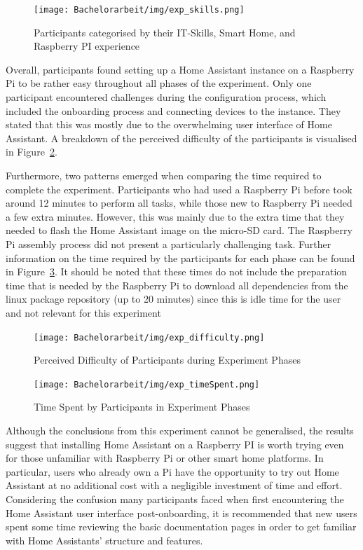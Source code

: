 \begin{figure}[H]
    \centering
    \texttt{[image: Bachelorarbeit/img/exp\_skills.png]}
    \caption{Participants categorised by their IT-Skills, Smart Home, and Raspberry PI experience}
    \label{fig:exp_skills}
\end{figure}

Overall, participants found setting up a Home Assistant instance on a Raspberry Pi to be rather easy throughout all phases of the experiment. Only one participant encountered challenges during the configuration process, which included the onboarding process and connecting devices to the instance. They stated that this was mostly due to the overwhelming user interface of Home Assistant. A breakdown of the perceived difficulty of the participants is visualised in Figure~\ref{fig:exp_difficulty}.

Furthermore, two patterns emerged when comparing the time required to complete the experiment. Participants who had used a Raspberry Pi before took around 12 minutes to perform all tasks, while those new to Raspberry Pi needed a few extra minutes. However, this was mainly due to the extra time that they needed to flash the Home Assistant image on the micro-SD card. The Raspberry Pi assembly process did not present a particularly challenging task. Further information on the time required by the participants for each phase can be found in Figure~\ref{fig:exp_timeSpent}. It should be noted that these times do not include the preparation time that is needed by the Raspberry Pi to download all dependencies from the linux package repository (up to 20 minutes) since this is idle time for the user and not relevant for this experiment

\begin{figure}[H]
    \centering
    \texttt{[image: Bachelorarbeit/img/exp\_difficulty.png]}
    \caption{Perceived Difficulty of Participants during Experiment Phases}
    \label{fig:exp_difficulty}
\end{figure}

\begin{figure}[H]
    \centering
    \texttt{[image: Bachelorarbeit/img/exp\_timeSpent.png]}
    \caption{Time Spent by Participants in Experiment Phases}
    \label{fig:exp_timeSpent}
\end{figure}

Although the conclusions from this experiment cannot be generalised, the results suggest that installing Home Assistant on a Raspberry PI is worth trying even for those unfamiliar with Raspberry Pi or other smart home platforms. In particular, users who already own a Pi have the opportunity to try out Home Assistant at no additional cost with a negligible investment of time and effort. Considering the confusion many participants faced when first encountering the Home Assistant user interface post-onboarding, it is recommended that new users spent some time reviewing the basic documentation pages in order to get familiar with Home Assistants' structure and features.

